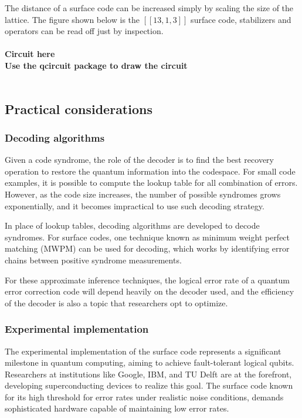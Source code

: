 \documentclass[final,5p,times,twocolumn,authoryear]{elsarticle}
\begin{document}
The distance of a surface code can be increased simply by scaling the size of the lattice. The figure shown below is the $[[13, 1, 3]]$ surface code, stabilizers and operators can be read off just by inspection.
\\
\\
\textbf{Circuit here}
\\
\textbf{Use the qcircuit package to draw the circuit}
\\
\\

\subsection{Practical considerations}
\subsubsection{Decoding algorithms}
Given a code syndrome, the role of the decoder is to find the best recovery operation to restore the quantum information into the codespace. For small code examples, it is possible to compute the lookup table for all combination of errors. However, as the code size increases, the number of possible syndromes grows exponentially, and it becomes impractical to use such decoding strategy.

In place of lookup tables, decoding algorithms are developed to decode syndromes. For surface codes, one technique known as minimum weight perfect matching (MWPM) can be used for decoding, which works by identifying error chains between positive syndrome measurements.

For these approximate inference techniques, the logical error rate of a quantum error correction code will depend heavily on the decoder used, and the efficiency of the decoder is also a topic that researchers opt to optimize.

\subsubsection{Experimental implementation}
The experimental implementation of the surface code represents a significant milestone in quantum computing, aiming to achieve fault-tolerant logical qubits. Researchers at institutions like Google, IBM, and TU Delft are at the forefront, developing superconducting devices to realize this goal. The surface code known for its high threshold for error rates under realistic noise conditions, demands sophisticated hardware capable of maintaining low error rates.
\end{document}
